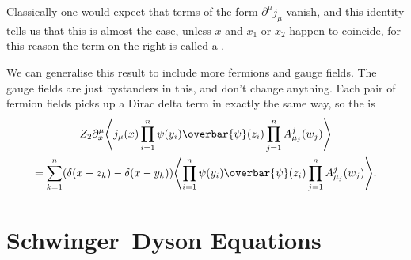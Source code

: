 \documentclass[fleqn]{NotesClass}
\newcommand{\diracadjoint}[1]{\overbar{#1}}
\DeclarePairedDelimiter{\correlator}{\langle}{\rangle}
\begin{document}
    Classically one would expect that terms of the form \(\partial^\mu j_\mu\) vanish, and this identity tells us that this is almost the case, unless \(x\) and \(x_1\) or \(x_2\) happen to coincide, for this reason the term on the right is called a .
    
    We can generalise this result to include more fermions and gauge fields.
    The gauge fields are just bystanders in this, and don't change anything.
    Each pair of fermion fields picks up a Dirac delta term in exactly the same way, so the  is
    \begin{multline}
        Z_2 \partial_x^\mu \correlator*{j_\mu(x) \prod_{i = 1}^n \psi(y_i) \diracadjoint{\psi}(z_i) \prod_{j=1}^{n}A^j_{\mu_j}(w_j)}\\
        = \sum_{k = 1}^{n} (\delta(x - z_k) - \delta(x - y_k)) \correlator*{\prod_{i=1}^{n} \psi(y_i) \diracadjoint{\psi}(z_i) \prod_{j=1}^n A^j_{\mu_j}(w_j)}.
    \end{multline}
    
    \section{Schwinger--Dyson Equations}
    
%        
    
    \backmatter
    \printindex
\end{document}

